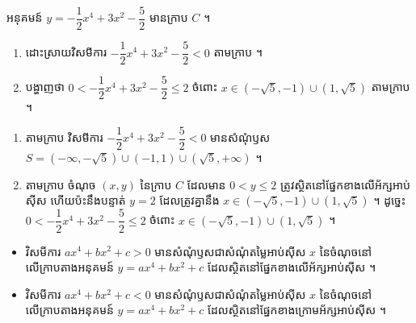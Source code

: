 \begin{example}[លំហាត់គំរូ]
អនុគមន៍ $y = -\dfrac{1}{2}x^4 + 3x^2 - \dfrac{5}{2}$ មានក្រាប $C$ ។
\begin{enumerate}[a]
  \item ដោះស្រាយវិសមីការ $-\dfrac{1}{2}x^4 + 3x^2 - \dfrac{5}{2} < 0$ តាមក្រាប ។
  \item បង្ហាញថា $0 < -\dfrac{1}{2}x^4 + 3x^2 - \dfrac{5}{2} \le 2$ ចំពោះ $x \in (-\sqrt{5}, -1) \cup (1, \sqrt{5})$ តាមក្រាប ។
\end{enumerate}
\end{example}
\ans
\begin{center}
\end{center}
\begin{enumerate}[a]
  \item តាមក្រាប វិសមីការ $-\dfrac{1}{2}x^4 + 3x^2 - \dfrac{5}{2} < 0$ មានសំណុំឫស $S = (-\infty, -\sqrt{5}) \cup (-1, 1) \cup (\sqrt{5}, +\infty)$ ។
  \item តាមក្រាប ចំណុច $(x, y)$ នៃក្រាប $C$ ដែលមាន $0 < y \le 2$ ត្រូវស្ថិតនៅផ្នែកខាងលើអ័ក្សអាប់ស៊ីស ហើយប៉ះនឹងបន្ទាត់ $y = 2$ ដែលត្រូវគ្នានឹង $x \in (-\sqrt{5}, -1) \cup (1, \sqrt{5})$ ។ ដូច្នេះ $0 < -\dfrac{1}{2}x^4 + 3x^2 - \dfrac{5}{2} \le 2$ ចំពោះ $x \in (-\sqrt{5}, -1) \cup (1, \sqrt{5})$ ។
\end{enumerate}

\begin{formulaBox}[ជាទូទៅ]
\begin{itemize}
  \item វិសមីការ $ax^4 + bx^2 + c > 0$ មានសំណុំឫសជាសំណុំតម្លៃអាប់ស៊ីស $x$ នៃចំណុចនៅលើក្រាបតាងអនុគមន៍ $y = ax^4 + bx^2 + c$ ដែលស្ថិតនៅផ្នែកខាងលើអ័ក្សអាប់ស៊ីស ។
  \item វិសមីការ $ax^4 + bx^2 + c < 0$ មានសំណុំឫសជាសំណុំតម្លៃអាប់ស៊ីស $x$ នៃចំណុចនៅលើក្រាបតាងអនុគមន៍ $y = ax^4 + bx^2 + c$ ដែលស្ថិតនៅផ្នែកខាងក្រោមអ័ក្សអាប់ស៊ីស ។
\end{itemize}
\end{formulaBox}

